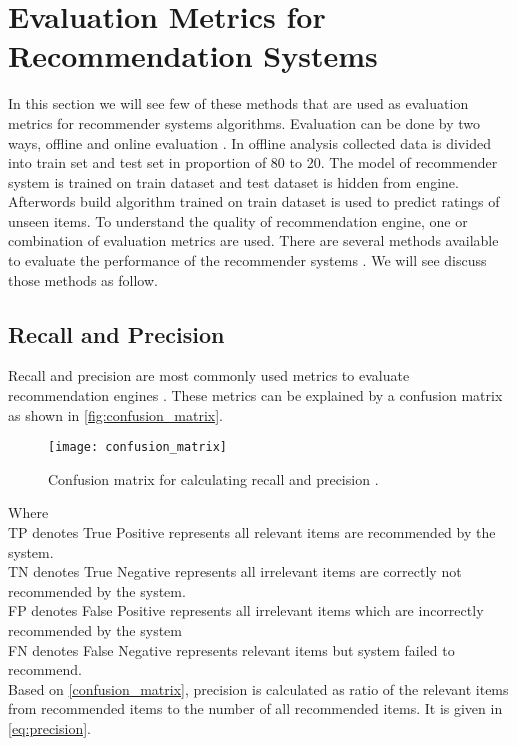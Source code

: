 
\section{Evaluation Metrics for Recommendation Systems}

In this section we will see few of these methods that are used as evaluation metrics for recommender systems algorithms. Evaluation can be done by two ways, offline and online evaluation \cite{22,23}. In offline analysis collected data is divided into train set and test set in proportion of 80 to 20. The model of recommender system is trained on train dataset and test dataset is hidden from engine. Afterwords build algorithm trained on train dataset is used to predict ratings of unseen items. To understand the quality of recommendation engine, one or combination of evaluation metrics are used. There are several methods available to evaluate the performance of the recommender systems \cite{22,24}. We will see discuss those methods as follow. 
  
\subsection{Recall and Precision}

Recall and precision are most commonly used metrics to evaluate recommendation engines \cite{25}. These metrics can be explained by a confusion matrix \cite{21} as shown in \autoref{fig:confusion_matrix}.
  
\begin{figure}[H]
	\centering
	\texttt{[image: confusion\_matrix]}
	\caption{Confusion matrix for calculating recall and precision \cite{21}.
	\label{confusion_matrix} }
	\label{fig:confusion_matrix}
\end{figure}

\noindent Where\\
TP denotes True Positive represents all relevant items are recommended by the system.\\
TN denotes True Negative represents all irrelevant items are correctly not recommended by the system.  \\
FP denotes False Positive represents all irrelevant items which are
incorrectly recommended by the system\\
FN denotes False Negative represents relevant items but system failed to recommend.\\
Based on \autoref{confusion_matrix}, precision is calculated as ratio of the relevant items from recommended items to the number of all recommended items. It is given in \autoref{eq:precision}. 

